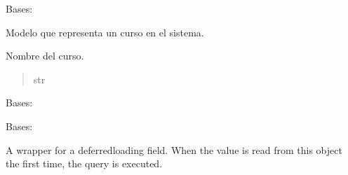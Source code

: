 \documentclass[letterpaper,10pt,spanish]{sphinxmanual}
\begin{document}
\begin{fulllineitems}

\pysigstartsignatures
{}
\pysigstopsignatures
\sphinxAtStartPar
Bases: 

\sphinxAtStartPar
Modelo que representa un curso en el sistema.


\begin{fulllineitems}

\pysigstartsignatures
{}
\pysigstopsignatures
\sphinxAtStartPar
Nombre del curso.
\begin{quote}\begin{description}
\sphinxAtStartPar
str

\end{description}\end{quote}

\end{fulllineitems}



\begin{fulllineitems}

\pysigstartsignatures
{}
\pysigstopsignatures
\sphinxAtStartPar
Bases: 

\end{fulllineitems}



\begin{fulllineitems}

\pysigstartsignatures
{}
\pysigstopsignatures
\sphinxAtStartPar
Bases: 

\end{fulllineitems}



\begin{fulllineitems}

\pysigstartsignatures
{}
\pysigstopsignatures
\sphinxAtStartPar
A wrapper for a deferred\sphinxhyphen{}loading field. When the value is read from this
object the first time, the query is executed.


\end{fulllineitems}
\end{fulllineitems}
\end{document}
